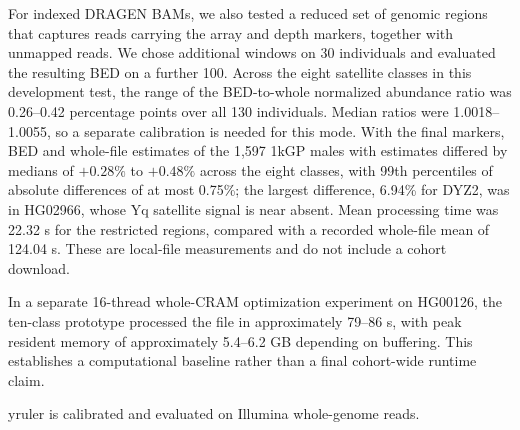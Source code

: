 \documentclass[pdflatex,sn-nature]{sn-jnl}
\newif\ifdraftnotes
\newcommand{\draftnote}[1]{\ifdraftnotes\par\smallskip{\noindent\color{draftink}\small\textbf{Author query:} #1\par}\smallskip\fi}
\begin{document}
For indexed DRAGEN BAMs, we also tested a reduced set of genomic regions that captures reads carrying the array and depth markers, together with unmapped reads. We chose additional windows on 30 individuals and evaluated the resulting BED on a further 100. Across the eight satellite classes in this development test, the range of the BED-to-whole normalized abundance ratio was 0.26--0.42 percentage points over all 130 individuals. Median ratios were 1.0018--1.0055, so a separate calibration is needed for this mode. With the final markers, BED and whole-file estimates of the 1,597 1kGP males with estimates differed by medians of $+0.28\%$ to $+0.48\%$ across the eight classes, with 99th percentiles of absolute differences of at most 0.75\%; the largest difference, 6.94\% for DYZ2, was in HG02966, whose Yq satellite signal is near absent. Mean processing time was 22.32 s for the restricted regions, compared with a recorded whole-file mean of 124.04 s. These are local-file measurements and do not include a cohort download.

In a separate 16-thread whole-CRAM optimization experiment on HG00126, the ten-class prototype processed the file in approximately 79--86 s, with peak resident memory of approximately 5.4--6.2 GB depending on buffering. This establishes a computational baseline rather than a final cohort-wide runtime claim.

yruler is calibrated and evaluated on Illumina whole-genome reads.

\draftnote{Repeat the alignment and restricted-region checks with the final markers and mode-specific calibration. Final runtime reporting needs a fixed software build, hardware description and separation of compute time from remote I/O. Long-read and Hi-C results require their own validated calibrations before quantitative claims are added.}
\end{document}
